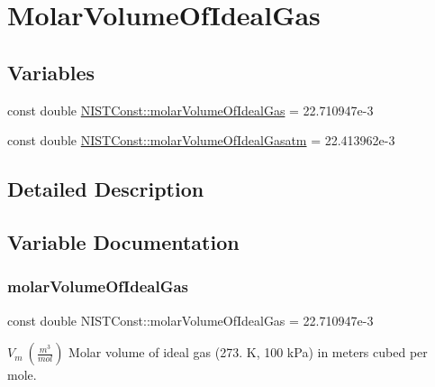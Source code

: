 \hypertarget{group___molar_volume_of_ideal_gas}{}\section{Molar\+Volume\+Of\+Ideal\+Gas}
\label{group___molar_volume_of_ideal_gas}
\subsection*{Variables}
\begin{DoxyCompactItemize}
\item 
const double \hyperlink{group___molar_volume_of_ideal_gas_ga666dc78c2b916ed12bcaf3ec15d7c4d3}{N\+I\+S\+T\+Const\+::molar\+Volume\+Of\+Ideal\+Gas} = 22.\+710947e-\/3
\item 
const double \hyperlink{group___molar_volume_of_ideal_gas_ga005e08baa33a25a474bd2287281883c4}{N\+I\+S\+T\+Const\+::molar\+Volume\+Of\+Ideal\+Gasatm} = 22.\+413962e-\/3
\end{DoxyCompactItemize}


\subsection{Detailed Description}


\subsection{Variable Documentation}
\mbox{\label{group___molar_volume_of_ideal_gas_ga666dc78c2b916ed12bcaf3ec15d7c4d3}} 
\subsubsection{\texorpdfstring{molar\+Volume\+Of\+Ideal\+Gas}{molarVolumeOfIdealGas}}
{\footnotesize\ttfamily const double N\+I\+S\+T\+Const\+::molar\+Volume\+Of\+Ideal\+Gas = 22.\+710947e-\/3}

$V_m \ (\frac{m^3}{mol})$ Molar volume of ideal gas (273. K, 100 k\+Pa) in meters cubed per mole. \mbox{\label{group___molar_volume_of_ideal_gas_ga005e08baa33a25a474bd2287281883c4}} 
